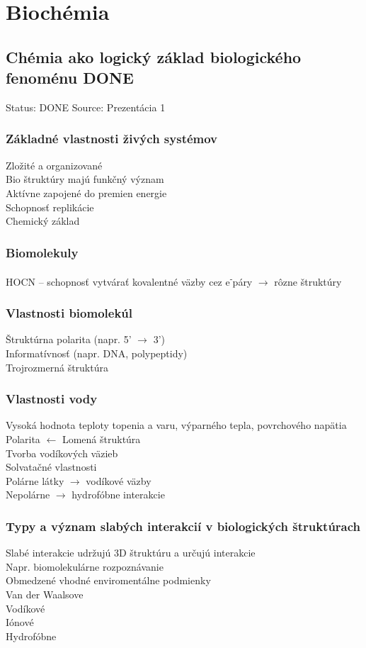 \newcommand\tab[1][1cm]{\hspace*{#1}}
\newcommand{\el}{e\textsuperscript{-}}
\chapter[Biochémia]{Biochémia}
\label{biochemia} %

\section{Chémia ako logický základ biologického fenoménu DONE}
Status: DONE
Source: Prezentácia 1
\\
\subsection*{Základné vlastnosti živých systémov}
Zložité a organizované\\
Bio štruktúry majú funkčný význam\\
Aktívne zapojené do premien energie\\
Schopnosť replikácie\\
Chemický základ
\subsection*{Biomolekuly}
HOCN -- schopnosť vytvárať kovalentné väzby cez \el páry $\rightarrow$ rôzne štruktúry
\subsection*{Vlastnosti biomolekúl}
Štruktúrna polarita (napr. 5' $\rightarrow$ 3')\\
Informatívnosť (napr. DNA, polypeptidy)\\
Trojrozmerná štruktúra\\
\subsection*{Vlastnosti vody}
Vysoká hodnota teploty topenia a varu, výparného tepla, povrchového napätia\\
Polarita $\leftarrow$ Lomená štruktúra\\
Tvorba vodíkových väzieb\\
Solvatačné vlastnosti\\
\tab Polárne látky $\rightarrow$ vodíkové väzby\\
\tab Nepolárne $\rightarrow$ hydrofóbne interakcie
\subsection*{Typy a význam slabých interakcií v biologických štruktúrach}
Slabé interakcie udržujú 3D štruktúru a určujú interakcie\\
\tab Napr. biomolekulárne rozpoznávanie\\
\tab Obmedzené vhodné enviromentálne podmienky\\
Van der Waalsove\\
Vodíkové\\
Iónové\\
Hydrofóbne
